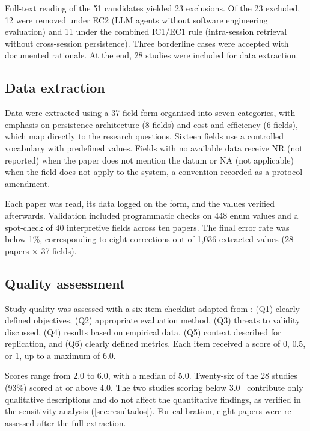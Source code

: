 Full-text reading of the 51 candidates yielded 23 exclusions.
Of the 23 excluded, 12 were removed under EC2 (LLM agents without
software engineering evaluation) and 11 under the combined IC1/EC1 rule
(intra-session retrieval without cross-session persistence).
Three borderline cases were accepted with documented rationale.
At the end, 28 studies were included for data extraction.

\subsection{Data extraction}
\label{sec:extracao}

Data were extracted using a 37-field form organised into seven
categories, with emphasis on persistence architecture (8 fields) and
cost and efficiency (6 fields), which map directly to the research
questions.
Sixteen fields use a controlled vocabulary with predefined values.
Fields with no available data receive NR (not reported) when the paper
does not mention the datum or NA (not applicable) when the field does
not apply to the system, a convention recorded as a protocol amendment.

Each paper was read, its data logged on the form, and the values
verified afterwards.
Validation included programmatic checks on 448 enum values and a
spot-check of 40 interpretive fields across ten papers.
The final error rate was below 1\%, corresponding to eight corrections
out of 1{,}036 extracted values (28 papers $\times$ 37 fields).

\subsection{Quality assessment}
\label{sec:qualidade}

Study quality was assessed with a six-item checklist adapted from
\citet{kitchenham2007guidelines}: (Q1) clearly defined objectives,
(Q2) appropriate evaluation method, (Q3) threats to validity discussed,
(Q4) results based on empirical data, (Q5) context described for
replication, and (Q6) clearly defined metrics.
Each item received a score of 0, 0.5, or 1, up to a maximum of 6.0.

Scores range from 2.0 to 6.0, with a median of 5.0.
Twenty-six of the 28 studies (93\%) scored at or above 4.0.
The two studies scoring below
3.0~\citep{bui2026opendev,du2026memory} contribute only qualitative
descriptions and do not affect the quantitative findings, as verified in
the sensitivity analysis (\autoref{sec:resultados}).
For calibration, eight papers were re-assessed after the full extraction.

